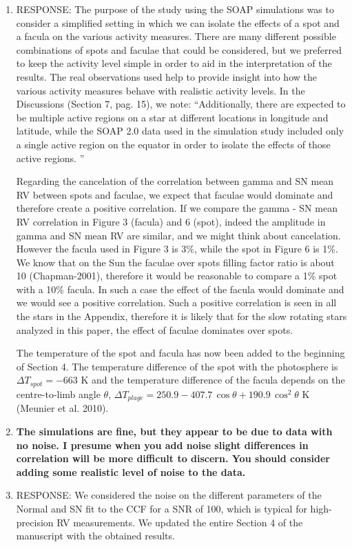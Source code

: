 \documentclass[11pt]{article}   	%
\begin{document}
\begin{enumerate}
\item[]  RESPONSE:  The purpose of the study using the SOAP simulations was to consider a simplified setting in which we can isolate the effects of a spot and a facula on the various activity measures.  There are many different possible combinations of spots and faculae that could be considered, but we preferred to keep the activity level simple in order to aid in the interpretation of the results.  The real observations used help to provide insight into how the various activity measures behave with realistic activity levels. In the Discussions (Section 7, pag. 15), we note: ``Additionally, there are expected to be multiple active regions on a star at different locations in longitude and latitude, while the SOAP 2.0 data used in the simulation study included only a single active region on the equator in order to isolate the effects of those active regions. ''

Regarding the cancelation of the correlation between gamma and SN mean RV between spots and faculae, we expect that faculae would dominate and therefore create a positive correlation. 
If we compare the gamma - SN mean RV correlation in Figure 3 (facula) and 6 (spot), indeed the amplitude in gamma and SN mean RV are similar, and we might think about cancelation. 
However the facula used in Figure 3 is 3\%, while the spot in Figure 6 is 1\%. 
We know that on the Sun the faculae over spots filling factor ratio is about 10 (Chapman-2001), therefore it would be reasonable to compare a 1\% spot with a 10\% facula. In such a case the effect of the facula would dominate and we would see a positive correlation. Such a positive correlation is seen in all the stars in the Appendix, therefore it is likely that for the slow rotating stars analyzed in this paper, the effect of faculae dominates over spots.

The temperature of the spot and facula has now been added to the beginning of Section 4. The temperature difference of the spot with the photosphere is $\Delta T_{spot} = -663$ K and the temperature difference of the facula depends on the centre-to-limb angle $\theta$,  $\Delta T_{plage} = 250.9 - 407.7\,\cos{\theta} + 190.9\,\cos^2 \theta$ K (Meunier et al. 2010).
\bigskip
%
%
\item {\bf The simulations are fine, but they appear to be due to data with no noise. I presume when you add noise slight differences in correlation will be more difficult to discern. You should consider adding some realistic level of noise to the data.}
%
\item[]  RESPONSE:  We considered the noise on the different parameters of the Normal and SN fit to the CCF for a SNR of 100, which is typical for high-precision RV measurements. We updated the entire Section 4 of the manuscript with the obtained results. 


\end{enumerate}
\end{document}
